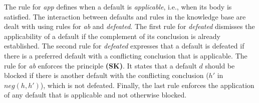 \documentclass{article}
\def\naf{\: {not} \:}
\begin{document}
%

 
The rule for {\it app} defines when a default is \emph{applicable}, i.e., when its body is satisfied. The interaction between defaults and rules in the knowledge base are dealt with using rules for {\it ab} and {\it defeated}. The first rule
        for {\it defeated}  dismisses the applicability of a default if the complement of its conclusion is already established. The second rule for {\it defeated} expresses that a default is defeated if there is a  preferred default with a conflicting conclusion that is applicable.
The rule for {\it ab} enforces the principle {\bf (SK)}. It states that a default $d$ should be blocked if there is another default with the conflicting conclusion ($h'$ in $neg(h, h')$), which is not defeated.
Finally, the last rule  enforces the application of any default that is applicable and not otherwise blocked.
 
\end{document}
